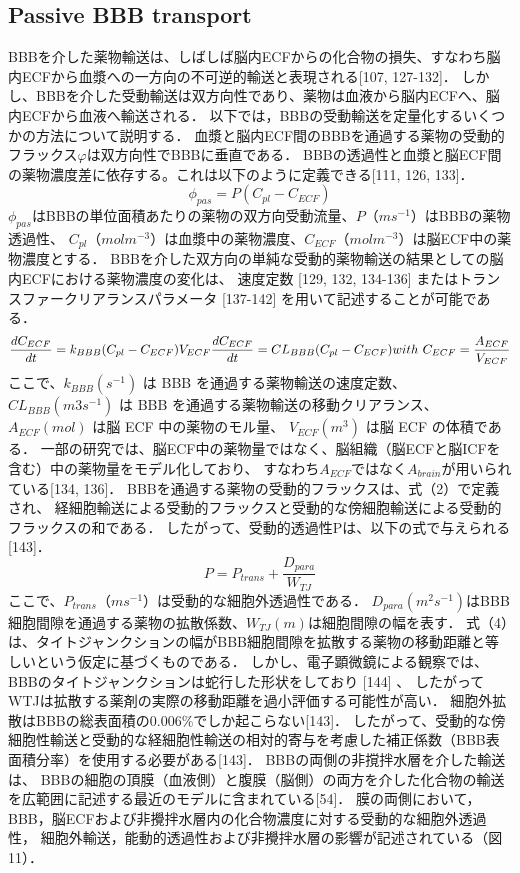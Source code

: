 \documentclass[11pt,a4paper]{jsarticle}
\begin{document}
\subsection{Passive BBB transport}
BBBを介した薬物輸送は、しばしば脳内ECFからの化合物の損失、すなわち脳内ECFから血漿への一方向の不可逆的輸送と表現される[107, 127-132]．
しかし、BBBを介した受動輸送は双方向性であり、薬物は血液から脳内ECFへ、脳内ECFから血液へ輸送される．
以下では，BBBの受動輸送を定量化するいくつかの方法について説明する．
血漿と脳内ECF間のBBBを通過する薬物の受動的フラックス$φ$は双方向性でBBBに垂直である．
BBBの透過性と血漿と脳ECF間の薬物濃度差に依存する。これは以下のように定義できる[111, 126, 133]．
\begin{equation}
    \phi_{pas}=P(C_{pl}-C_{ECF})
\end{equation}
$\phi_{pas}$はBBBの単位面積あたりの薬物の双方向受動流量、$P（m s^{-1}）$はBBBの薬物透過性、
$C_{pl}（mol m^{-3}）$は血漿中の薬物濃度、$C_{ECF}（mol m^{-3}）$は脳ECF中の薬物濃度とする．
BBBを介した双方向の単純な受動的薬物輸送の結果としての脳内ECFにおける薬物濃度の変化は、
速度定数 [129, 132, 134-136] またはトランスファークリアランスパラメータ [137-142] を用いて記述することが可能である．
\begin{equation}
    \frac{dC_{ECF}}{dt}=k_{BBB}(C_{pl}-C_{ECF})\\
    V_{ECF}\frac{dC_{ECF}}{dt}=CL_{BBB}(C_{pl}-C_{ECF})\\
    with\ C_{ECF}=\frac{A_{ECF}}{V_{ECF}}
\end{equation}
ここで、$k_{BBB} (s^{-1})$ は BBB を通過する薬物輸送の速度定数、
$CL_{BBB} (m3 s^{-1})$ は BBB を通過する薬物輸送の移動クリアランス、
$A_{ECF} (mol)$ は脳 ECF 中の薬物のモル量、
$V_{ECF} (m^3)$ は脳 ECF の体積である．
一部の研究では、脳ECF中の薬物量ではなく、脳組織（脳ECFと脳ICFを含む）中の薬物量をモデル化しており、
すなわち$A_{ECF}$ではなく$A_{brain}$が用いられている[134, 136]．
BBBを通過する薬物の受動的フラックスは、式（2）で定義され、
経細胞輸送による受動的フラックスと受動的な傍細胞輸送による受動的フラックスの和である．
したがって、受動的透過性Pは、以下の式で与えられる[143]．
\begin{equation}
    P=P_{trans}+\frac{D_{para}}{W_{TJ}}
\end{equation}
ここで、$P_{trans}（m s^{-1}）$は受動的な細胞外透過性である．
$D_{para}(m^2 s^{-1})$はBBB細胞間隙を通過する薬物の拡散係数、$W_{TJ}(m)$は細胞間隙の幅を表す．
式（4）は、タイトジャンクションの幅がBBB細胞間隙を拡散する薬物の移動距離と等しいという仮定に基づくものである．
しかし、電子顕微鏡による観察では、BBBのタイトジャンクションは蛇行した形状をしており [144] 、
したがってWTJは拡散する薬剤の実際の移動距離を過小評価する可能性が高い．
細胞外拡散はBBBの総表面積の0.006\%でしか起こらない[143]．
したがって、受動的な傍細胞性輸送と受動的な経細胞性輸送の相対的寄与を考慮した補正係数（BBB表面積分率）を使用する必要がある[143]．
BBBの両側の非撹拌水層を介した輸送は、
BBBの細胞の頂膜（血液側）と腹膜（脳側）の両方を介した化合物の輸送を広範囲に記述する最近のモデルに含まれている[54]．
膜の両側において，BBB，脳ECFおよび非攪拌水層内の化合物濃度に対する受動的な細胞外透過性，
細胞外輸送，能動的透過性および非攪拌水層の影響が記述されている（図11）．
\end{document}
